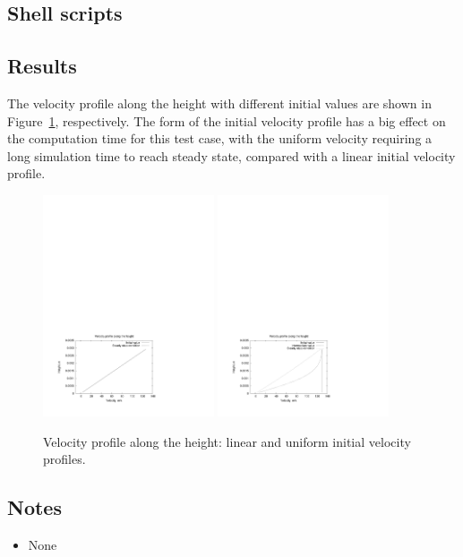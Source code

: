 \noindent\topbar

\bottombar


\subsection{Shell scripts}
\label{couette-flow-3D-sh-files}
\topbar

\bottombar

\subsection{Results}
%
The velocity profile along the height with different initial values are 
shown in Figure~\ref{couette3-linearuniform-fig}, respectively. 
The form of the initial velocity profile has a big effect on the computation time for this test case, 
with the uniform velocity requiring a long simulation time to reach steady state, 
compared with a linear initial velocity profile.

\begin{figure}[htbp]
\begin{center}
\includegraphics[width=0.45\textwidth,viewport=39 52 414 298,clip=true]{../3D/couette-flow/c_3D_linear.pdf}
\includegraphics[width=0.45\textwidth,viewport=39 52 414 298,clip=true]{../3D/couette-flow/c_3D_uniform.pdf}
\end{center}
\caption{Velocity profile along the height: linear and uniform initial velocity profiles.}
   \label{couette3-linearuniform-fig}
\end{figure}


\subsection{Notes}
\begin{itemize}
\item None
\end{itemize}


